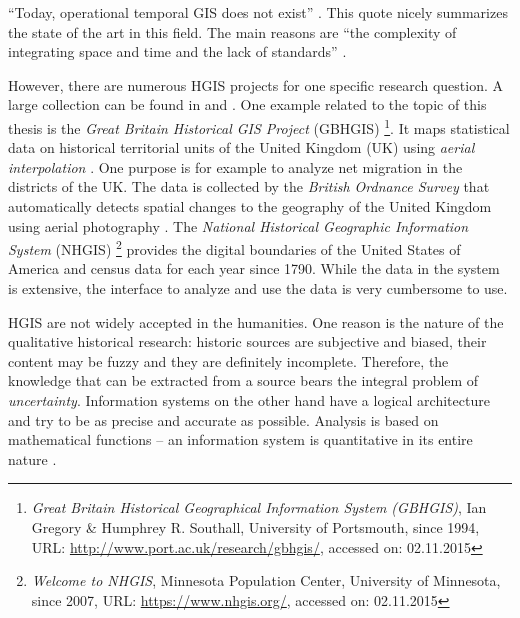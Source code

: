 ``Today, operational temporal GIS does not exist''
\cite[p. 5]{raza12}.
This quote nicely summarizes the state of the art in this field. The main reasons are ``the complexity of integrating space and time and the lack of standards''
\cite[p. 5]{raza12}.

However, there are numerous HGIS projects for one specific research question. A large collection can be found in \cite{knowles2008placing} and \cite{gregory2014toward}.
One example related to the topic of this thesis is the \emph{Great Britain Historical GIS Project} (GBHGIS)
\footnote{
  \textit{Great Britain Historical Geographical Information System (GBHGIS)},
  Ian Gregory \& Humphrey R. Southall, University of Portsmouth, since 1994,
  URL: \url{http://www.port.ac.uk/research/gbhgis/},
  accessed on: 02.11.2015
}.
It maps statistical data on historical territorial units of the United Kingdom (UK) using \emph{aerial interpolation}
\cite{aerialInterpolation}.
One purpose is for example to analyze net migration in the districts of the UK. The data is collected by the \emph{British Ordnance Survey} that automatically detects spatial changes to the geography of the United Kingdom using aerial photography \cite{ordnanceSurvey}.
The \emph{National Historical Geographic Information System} (NHGIS)
\footnote{
  \textit{Welcome to NHGIS},
  Minnesota Population Center, University of Minnesota,
  since 2007,
  URL: \url{https://www.nhgis.org/},
  accessed on: 02.11.2015
}
provides the digital boundaries of the United States of America and census data for each year since 1790. While the data in the system is extensive, the interface to analyze and use the data is very cumbersome to use.

HGIS are not widely accepted in the humanities. One reason is the nature of the qualitative historical research: historic sources are subjective and biased, their content may be fuzzy and they are definitely incomplete. Therefore, the knowledge that can be extracted from a source bears the integral problem of \emph{uncertainty}. Information systems on the other hand have a logical architecture and try to be as precise and accurate as possible. Analysis is based on mathematical functions -- an information system is quantitative in its entire nature
\cite[p. 2]{knowles2008placing}.



